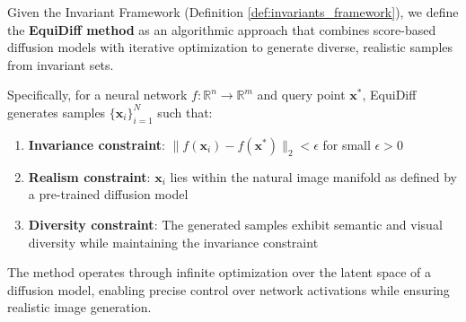 \begin{defi}\label{def:equidiff_method}
Given the Invariant Framework (Definition \ref{def:invariants_framework}), we define the \textbf{EquiDiff method} as an algorithmic approach that combines score-based diffusion models with iterative optimization to generate diverse, realistic samples from invariant sets.

Specifically, for a neural network $f: \mathbb{R}^n \rightarrow \mathbb{R}^m$ and query point $\mathbf{x}^*$, EquiDiff generates samples $\{\mathbf{x}_i\}_{i=1}^N$ such that:
\begin{enumerate}
\item \textbf{Invariance constraint}: $\|f(\mathbf{x}_i) - f(\mathbf{x}^*)\|_2 < \epsilon$ for small $\epsilon > 0$
\item \textbf{Realism constraint}: $\mathbf{x}_i$ lies within the natural image manifold as defined by a pre-trained diffusion model
\item \textbf{Diversity constraint}: The generated samples exhibit semantic and visual diversity while maintaining the invariance constraint
\end{enumerate}

The method operates through infinite optimization over the latent space of a diffusion model, enabling precise control over network activations while ensuring realistic image generation.
\end{defi}

